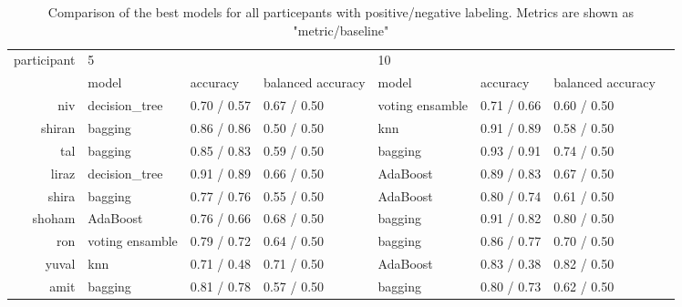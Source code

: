 \begin{table}[!h]
    \begin{tabular}{rlllllll}
        \toprule
        participant &      \multicolumn{3}{l}{5} & \multicolumn{3}{l}{10} \\
              &             model &     accuracy & balanced accuracy &            model &     accuracy & balanced accuracy \\
        \midrule
             niv &    decision\_tree &  0.70 / 0.57 &       0.67 / 0.50 &  voting ensamble &  0.71 / 0.66 &       0.60 / 0.50 \\
          shiran &          bagging &  0.86 / 0.86 &       0.50 / 0.50 &              knn &  0.91 / 0.89 &       0.58 / 0.50 \\
             tal &          bagging &  0.85 / 0.83 &       0.59 / 0.50 &          bagging &  0.93 / 0.91 &       0.74 / 0.50 \\
           liraz &    decision\_tree &  0.91 / 0.89 &       0.66 / 0.50 &         AdaBoost &  0.89 / 0.83 &       0.67 / 0.50 \\
           shira &          bagging &  0.77 / 0.76 &       0.55 / 0.50 &         AdaBoost &  0.80 / 0.74 &       0.61 / 0.50 \\
          shoham &         AdaBoost &  0.76 / 0.66 &       0.68 / 0.50 &          bagging &  0.91 / 0.82 &       0.80 / 0.50 \\
             ron &  voting ensamble &  0.79 / 0.72 &       0.64 / 0.50 &          bagging &  0.86 / 0.77 &       0.70 / 0.50 \\
           yuval &              knn &  0.71 / 0.48 &       0.71 / 0.50 &         AdaBoost &  0.83 / 0.38 &       0.82 / 0.50 \\
            amit &          bagging &  0.81 / 0.78 &       0.57 / 0.50 &          bagging &  0.80 / 0.73 &       0.62 / 0.50 \\
        \bottomrule
    \end{tabular}
    \caption{Comparison of the best models for all particepants with positive/negative labeling. Metrics are shown as "metric/baseline"}
\end{table}

